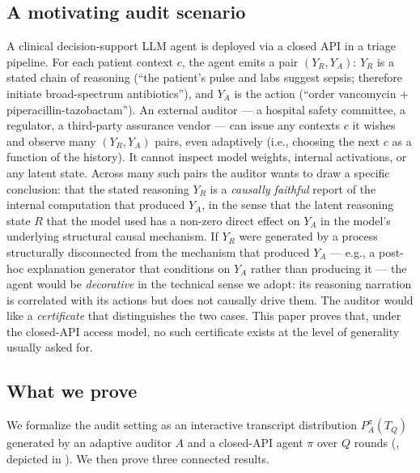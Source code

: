 \documentclass{article}
\theoremstyle{plain}
\theoremstyle{definition}
\theoremstyle{remark}
\begin{document}
\subsection{A motivating audit scenario}

A clinical decision-support LLM agent is deployed via a closed API in a triage
pipeline. For each patient context $c$, the agent emits a pair $(Y_R, Y_A)$:
$Y_R$ is a stated chain of reasoning (``the patient's pulse and labs suggest
sepsis; therefore initiate broad-spectrum antibiotics''), and $Y_A$ is the
action (``order vancomycin + piperacillin-tazobactam''). An external auditor
--- a hospital safety committee, a regulator, a third-party assurance vendor
--- can issue any contexts $c$ it wishes and observe many $(Y_R, Y_A)$ pairs,
even adaptively (i.e., choosing the next $c$ as a function of the history). It
cannot inspect model weights, internal activations, or any latent state.
Across many such pairs the auditor wants to draw a specific conclusion: that
the stated reasoning $Y_R$ is a \emph{causally faithful} report of the
internal computation that produced $Y_A$, in the sense that the latent
reasoning state $R$ that the model used has a non-zero direct effect on
$Y_A$ in the model's underlying structural causal mechanism. If $Y_R$ were
generated by a process structurally disconnected from the mechanism that
produced $Y_A$ --- e.g., a post-hoc explanation generator that conditions on
$Y_A$ rather than producing it --- the agent would be \emph{decorative} in
the technical sense we adopt: its reasoning narration is correlated with its
actions but does not causally drive them. The auditor would like a
\emph{certificate} that distinguishes the two cases. This paper proves that,
under the closed-API access model, no such certificate exists at the level of
generality usually asked for.

\subsection{What we prove}

We formalize the audit setting as an interactive transcript distribution
$P_A^\pi(T_Q)$ generated by an adaptive auditor $A$ and a closed-API agent
$\pi$ over $Q$ rounds (, depicted in
). We then prove three connected results.
\end{document}
